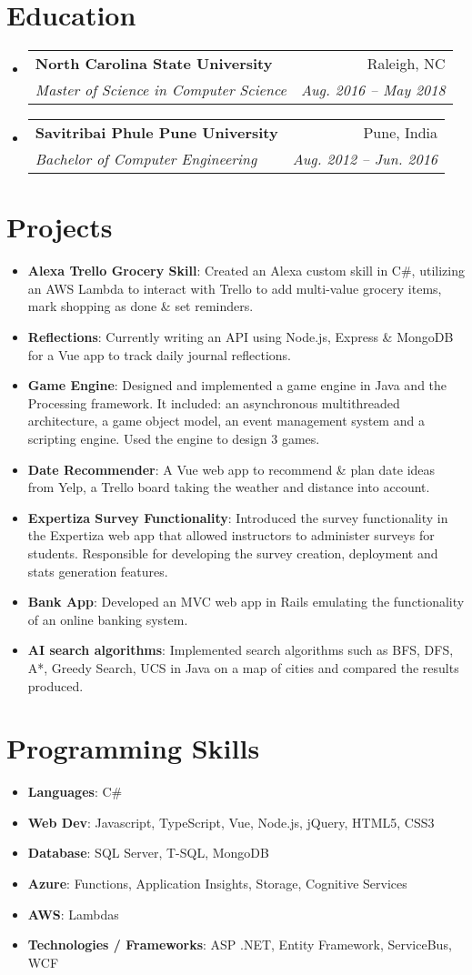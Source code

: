\documentclass[letterpaper,11pt]{article}
\makeatletter
\newcommand{\resumeItem}[2]{
  \item\small{
    \textbf{#1}{: #2 \vspace{-2pt}}
  }
}
\newcommand{\resumeSubheading}[4]{
  \vspace{-1pt}\item
    \begin{tabular*}{0.97\textwidth}{l@{\extracolsep{\fill}}r}
      \textbf{#1} & #2 \\
      \textit{\small#3} & \textit{\small #4} \\
    \end{tabular*}\vspace{-5pt}
}
\newcommand{\resumeSubItem}[2]{\resumeItem{#1}{#2}\vspace{-4pt}}
\newcommand{\resumeSubHeadingListStart}{\begin{itemize}[leftmargin=*]}
\newcommand{\resumeSubHeadingListEnd}{\end{itemize}}
\makeatother
\begin{document}

\section{Education}
  \resumeSubHeadingListStart
    \resumeSubheading
      {North Carolina State University}{Raleigh, NC}
      {Master of Science in Computer Science}{Aug. 2016 -- May 2018}
    \resumeSubheading
      {Savitribai Phule Pune University}{Pune, India}
      {Bachelor of Computer Engineering}{Aug. 2012 -- Jun. 2016}
  \resumeSubHeadingListEnd
  

\section{Projects}
  \resumeSubHeadingListStart
  	\resumeSubItem{Alexa Trello Grocery Skill}
      {Created an Alexa custom skill in C\#, utilizing an AWS Lambda to interact with Trello to add multi-value grocery items, mark shopping as done \& set reminders.}
    \resumeSubItem{Reflections}
      {Currently writing an API using Node.js, Express \& MongoDB for a Vue app to track daily journal reflections.}
    \resumeSubItem{Game Engine}
      {Designed and implemented a game engine in Java and the Processing framework. It included: an asynchronous multithreaded architecture, a game object model, an event management system and a scripting engine. Used the engine to design 3 games.}
      \resumeSubItem{Date Recommender}
      {A Vue web app to recommend \& plan date ideas from Yelp, a Trello board taking the weather and distance into account.}
    \resumeSubItem{Expertiza Survey Functionality}
      {Introduced the survey functionality in the Expertiza web app that allowed instructors to administer surveys for students. Responsible for developing the survey creation, deployment and stats generation features.}
    \resumeSubItem{Bank App}
      {Developed an MVC web app in Rails emulating the functionality of an online banking system.}
      \resumeSubItem{AI search algorithms}
      {Implemented search algorithms such as BFS, DFS, A*, Greedy Search, UCS in Java on a map of cities and compared the results produced.}
  \resumeSubHeadingListEnd


\section{Programming Skills}
  \resumeSubHeadingListStart
    \resumeSubItem{Languages}{C\#}
    \resumeSubItem{Web Dev}{Javascript, TypeScript, Vue, Node.js, jQuery, HTML5, CSS3}
    \resumeSubItem{Database}{SQL Server, T-SQL, MongoDB}    
    \resumeSubItem{Azure}{Functions, Application Insights, Storage, Cognitive Services}
    \resumeSubItem{AWS}{Lambdas}
    \resumeSubItem{Technologies / Frameworks}{ASP .NET, Entity Framework, ServiceBus, WCF}
  \resumeSubHeadingListEnd

\end{document}

